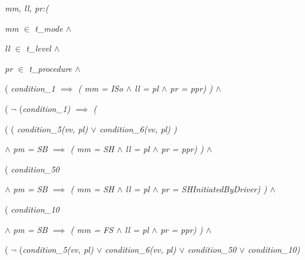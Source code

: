 {\begin{minipage}{14cm}
\hspace*{0.40in}\it mm\rm , \it ll\rm , \it pr\hspace*{0.10in}\rm :\rm (

\hspace*{0.60in}\it mm  $\in$  \it t\_mode  $\land$ 

\hspace*{0.60in}\it ll  $\in$  \it t\_level  $\land$ 

\hspace*{0.60in}\it pr  $\in$  \it t\_procedure  $\land$ 

\hspace*{0.60in}\rm ( \it condition\_1\hspace*{0.10in} $\implies$  \rm ( \it mm \rm = \it ISo  $\land$  \it ll \rm = \it pl  $\land$  \it pr \rm = \it ppr\rm ) \rm )  $\land$ 

\hspace*{0.60in}\rm (  $\neg$ \rm (\it condition\_1\rm )  $\implies$  \rm (

\hspace*{0.80in}\rm ( \rm ( \it condition\_5\rm (\it vv\rm , \it pl\rm )  $\lor$  \it condition\_6\rm (\it vv\rm , \it pl\rm ) \rm )\hspace*{0.25in}

\hspace*{1.00in} $\land$  \it pm \rm = \it SB  $\implies$  \rm ( \it mm \rm = \it SH  $\land$  \it ll \rm = \it pl  $\land$  \it pr \rm = \it ppr\rm ) \rm )  $\land$ 

\hspace*{0.80in}\rm ( \it condition\_50 

\hspace*{1.00in} $\land$  \it pm \rm = \it SB  $\implies$  \rm ( \it mm \rm = \it SH\hspace*{0.10in} $\land$  \it ll \rm = \it pl  $\land$  \it pr \rm = \it SHInitiatedByDriver\rm ) \rm )  $\land$ 

\hspace*{0.80in}\rm ( \it condition\_10 

\hspace*{1.00in} $\land$  \it pm \rm = \it SB  $\implies$  \rm ( \it mm \rm = \it FS  $\land$  \it ll \rm = \it pl  $\land$  \it pr \rm = \it ppr\rm ) \rm )  $\land$ 

\hspace*{0.80in}\rm (  $\neg$ \rm (\it condition\_5\rm (\it vv\rm , \it pl\rm )  $\lor$  \it condition\_6\rm (\it vv\rm , \it pl\rm )  $\lor$  \it condition\_50  $\lor$  \it condition\_10\rm ) 


\end{minipage}}

